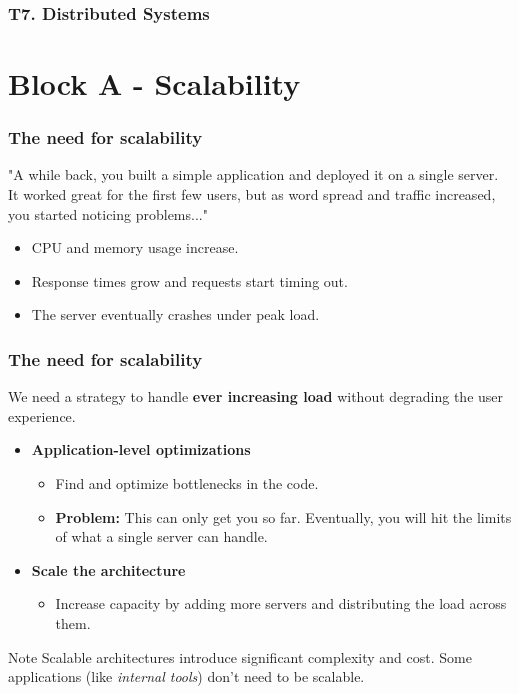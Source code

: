 \documentclass{beamer}
\title{\maintitle}
\author{Enterprise Software Architectures}
\institute
{
  Bachelor's Degree in Computer Engineering
}
\date{Academic year 2025/26}
\newcommand{\maintitle}{T7. Distributed Systems}
\begin{document}
\begin{frame}
  \titlepage
\end{frame}

\begin{frame}
  \frametitle{\maintitle}
  \tableofcontents[subsectionstyle=show]
\end{frame}

\section{Block A - Scalability}

\begin{frame}
  \frametitle{The need for scalability}

  "A while back, you built a simple application and deployed it on a single server. It worked great for the first few users, but as word spread and traffic increased, you started noticing problems..."
  \newline

  \begin{itemize}
    \item CPU and memory usage increase.
    \item Response times grow and requests start timing out.
    \item The server eventually crashes under peak load.
  \end{itemize}
\end{frame}

\begin{frame}
  \frametitle{The need for scalability}

  We need a strategy to handle \textbf{ever increasing load} without degrading the user experience.

  \begin{itemize}
    \item \textbf{Application-level optimizations}
    \begin{itemize}
      \item Find and optimize bottlenecks in the code.
      \item \textbf{Problem:} This can only get you so far. Eventually, you will hit the limits of what a single server can handle.
    \end{itemize}
    \item \textbf{Scale the architecture}
    \begin{itemize}
      \item Increase capacity by adding more servers and distributing the load across them.
    \end{itemize}
  \end{itemize}

  \begin{exampleblock}{Note}
    Scalable architectures introduce significant complexity and cost. Some applications (like \textit{internal tools}) don't need to be scalable.
  \end{exampleblock}
\end{frame}
\end{document}
